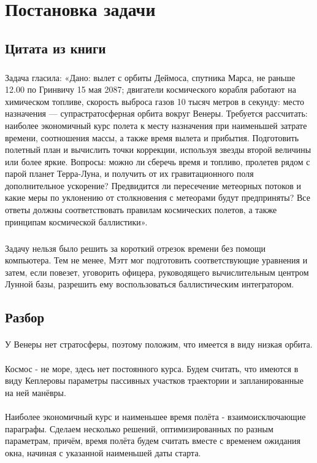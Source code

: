 \section{Постановка задачи}

\subsection{Цитата из книги}
\subparagraph{}Задача гласила: «Дано: вылет с орбиты Деймоса, спутника Марса, не раньше 12.00 по Гринвичу 15 мая 2087; двигатели космического корабля работают на химическом топливе, скорость выброса газов 10 тысяч метров в секунду: место назначения — супрастратосферная орбита вокруг Венеры. Требуется рассчитать: наиболее экономичный курс полета к месту назначения при наименьшей затрате времени, соотношения массы, а также время вылета и прибытия. Подготовить полетный план и вычислить точки коррекции, используя звезды второй величины или более яркие. Вопросы: можно ли сберечь время и топливо, пролетев рядом с парой планет Терра-Луна, и получить от их гравитационного поля дополнительное ускорение? Предвидится ли пересечение метеорных потоков и какие меры по уклонению от столкновения с метеорами будут предприняты? Все ответы должны соответствовать правилам космических полетов, а также принципам космической баллистики».
\subparagraph{}Задачу нельзя было решить за короткий отрезок времени без помощи компьютера. Тем не менее, Мэтт мог подготовить соответствующие уравнения и затем, если повезет, уговорить офицера, руководящего вычислительным центром Лунной базы, разрешить ему воспользоваться баллистическим интегратором.

\subsection{Разбор}
\paragraph{}У Венеры нет стратосферы, поэтому положим, что имеется в виду низкая орбита.
\paragraph{}Космос - не море, здесь нет постоянного курса. Будем считать, что имеются в виду Кеплеровы параметры пассивных участков траектории и запланированные на ней манёвры.
\paragraph{}Наиболее экономичный курс и наименьшее время полёта - взаимоисключающие параграфы. Сделаем несколько решений, оптимизированных по разным параметрам, причём, время полёта будем считать вместе с временем ожидания окна, начиная с указанной наименьшей даты старта.
